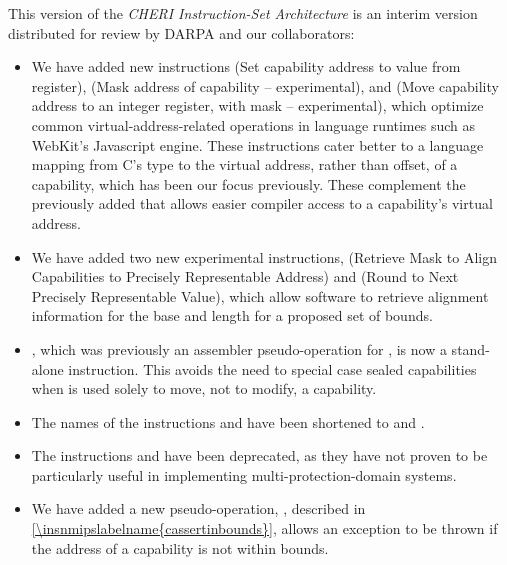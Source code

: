 This version of the \textit{CHERI Instruction-Set Architecture} is an interim
version distributed for review by DARPA and our collaborators:

\begin{itemize}
\item We have added new instructions  (Set capability
  address to value from register),  (Mask address of
  capability -- experimental), and  (Move capability
  address to an integer register, with mask -- experimental), which optimize
  common virtual-address-related operations in language runtimes such as
  WebKit's Javascript engine.
  These instructions cater better to a language mapping from C's
   type to the virtual address, rather than offset, of a
  capability, which has been our focus previously.
  These complement the previously added  that allows
  easier compiler access to a capability's virtual address.

\item We have added two new experimental instructions, 
  (Retrieve Mask to Align Capabilities to Precisely Representable Address) and
   (Round to Next Precisely Representable Value), which
  allow software to retrieve alignment information for the base and length for
  a proposed set of bounds.

\item {}, which was previously an assembler pseudo-operation
  for , is now a stand-alone instruction.
  This avoids the need to special case sealed capabilities when
   is used solely to move, not to modify, a
  capability.

\item The names of the instructions  and
   have been shortened to
   and .

\item The instructions  and 
  have been deprecated, as they have not proven to be particularly useful in
  implementing multi-protection-domain systems.

\item We have added a new pseudo-operation, ,
  described in \cref{\insnmipslabelname{cassertinbounds}}, allows an exception
  to be thrown if the address of a capability is not within bounds.


\end{itemize}

